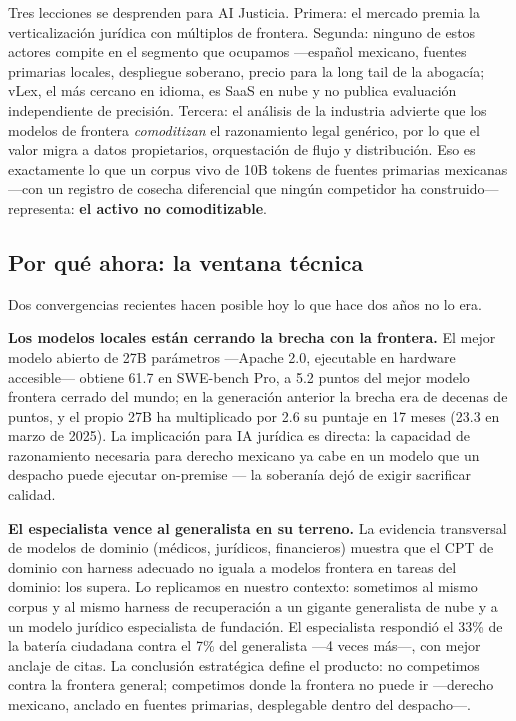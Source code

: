 Tres lecciones se desprenden para AI Justicia. Primera: el mercado premia la verticalización jurídica con múltiplos de frontera. Segunda: ninguno de estos actores compite en el segmento que ocupamos ---español mexicano, fuentes primarias locales, despliegue soberano, precio para la long tail de la abogacía; vLex, el más cercano en idioma, es SaaS en nube y no publica evaluación independiente de precisión.\cite{vaquill2026} Tercera: el análisis de la industria advierte que los modelos de frontera \emph{comoditizan} el razonamiento legal genérico, por lo que el valor migra a datos propietarios, orquestación de flujo y distribución.\cite{sacra2026} Eso es exactamente lo que un corpus vivo de 10B tokens de fuentes primarias mexicanas ---con un registro de cosecha diferencial que ningún competidor ha construido--- representa: \textbf{el activo no comoditizable}.

\subsection{Por qué ahora: la ventana técnica}\label{sec:ventana}

Dos convergencias recientes hacen posible hoy lo que hace dos años no lo era.\vspace{0.3em}

\textbf{Los modelos locales están cerrando la brecha con la frontera.} El mejor modelo abierto de 27B parámetros ---Apache 2.0, ejecutable en hardware accesible--- obtiene 61.7 en SWE-bench Pro, a 5.2 puntos del mejor modelo frontera cerrado del mundo; en la generación anterior la brecha era de decenas de puntos, y el propio 27B ha multiplicado por 2.6 su puntaje en 17 meses (23.3 en marzo de 2025).\cite{qwen38_2026,swebench_pro} La implicación para IA jurídica es directa: la capacidad de razonamiento necesaria para derecho mexicano ya cabe en un modelo que un despacho puede ejecutar on-premise --- la soberanía dejó de exigir sacrificar calidad.\vspace{0.3em}

\textbf{El especialista vence al generalista en su terreno.} La evidencia transversal de modelos de dominio (médicos, jurídicos, financieros) muestra que el CPT de dominio con harness adecuado no iguala a modelos frontera en tareas del dominio: los supera. Lo replicamos en nuestro contexto: sometimos al mismo corpus y al mismo harness de recuperación a un gigante generalista de nube y a un modelo jurídico especialista de fundación. El especialista respondió el 33\% de la batería ciudadana contra el 7\% del generalista ---4 veces más---, con mejor anclaje de citas. La conclusión estratégica define el producto: no competimos contra la frontera general; competimos donde la frontera no puede ir ---derecho mexicano, anclado en fuentes primarias, desplegable dentro del despacho---.
